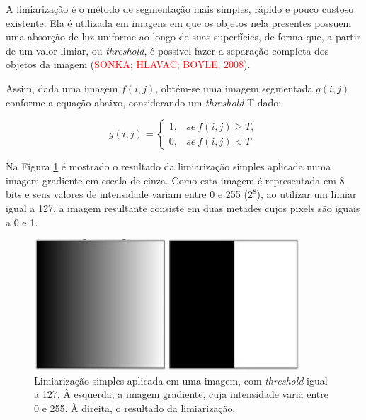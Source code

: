 A limiarização é o método de segmentação mais simples, rápido e pouco custoso existente. Ela é utilizada em imagens em que os objetos nela presentes possuem uma absorção de luz uniforme ao longo de suas superfícies, de forma que, a partir de um valor limiar, ou \textit{threshold}, é possível fazer a separação completa dos objetos da imagem (\textcolor{red}{SONKA; HLAVAC; BOYLE, 2008}).

Assim, dada uma imagem $f(i, j)$, obtém-se uma imagem segmentada $g(i, j)$ conforme a equação abaixo, considerando um \textit{threshold} T dado:

\begin{equation} \label{eq:thrd}
	g(i, j) =
		\begin{cases}
			1, & se \ f(i, j) \geq T, \\	
			0, & se \ f(i, j) < T
		\end{cases}
\end{equation}

Na Figura \ref{img:thresholding} é mostrado o resultado da limiarização simples aplicada numa imagem gradiente em escala de cinza. Como esta imagem é representada em 8 bits e seus valores de intensidade  variam entre 0 e 255 ($2^8$), ao utilizar um limiar igual a 127, a imagem resultante consiste em duas metades cujos pixels são iguais a 0 e 1. 

\begin{figure}[H]
\centering
    \caption{\label{img:thresholding} Limiarização simples aplicada em uma imagem, com \textit{threshold} igual a 127. À esquerda, a imagem gradiente, cuja intensidade varia entre 0 e 255. À direita, o resultado da limiarização.}
    \includegraphics[scale=0.5]{img/thresholding.png}
\end{figure}


